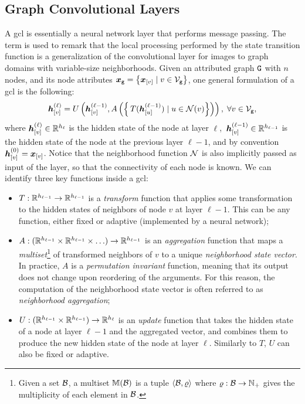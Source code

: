\subsection{Graph Convolutional Layers}\label{sec:graph-conv-layers}
A \gls{gcl} is essentially a neural network layer that performs message passing. The term  is used to remark that the local processing performed by the state transition function is a generalization of the convolutional layer for images to graph domains with variable-size neighborhoods. Given an attributed graph $\GraphU{g}$ with $n$ nodes, and its node attributes $\GraphFeatures{x}{g} = \Set{\Elem{x}{v} \mid v \in \Nodes{g}}$, one general formulation of a \gls{gcl} is the following:
\begin{align}
    \label{eq:simple-aggregation}
    \StateVector{v}{\ell} = U \Par{\StateVector{v}{\ell-1}, A\Par{\Set{\,T(\StateVector{u}{\ell-1}) \mid u \in \Neigh(v)}}}, \; \forall v \in \Nodes{g},
\end{align}
where $\StateVector{v}{\ell} \in \Real^{h_\ell}$ is the hidden state of the node at layer $\ell$, $\,\StateVector{v}{\ell-1} \in \Real^{h_{\ell-1}}$ is the hidden state of the node at the previous layer $\ell-1$, and by convention $\StateVector{v}{0} = \Elem{x}{v}$. Notice that the neighborhood function $\Neigh$ is also implicitly passed as input of the layer, so that the connectivity of each node is known. We can identify three key functions inside a \gls{gcl}:
\begin{itemize}
    \item $T: \mathbb{R}^{h_{\ell-1}} \rightarrow \mathbb{R}^{h_{\ell-1}}$ is a \emph{transform} function that applies some transformation to the hidden states of neighbors of node $v$ at layer $\ell-1$. This can be any function, either fixed or adaptive (implemented by a neural network);
    \item $A: (\mathbb{R}^{h_{\ell-1}} \times \mathbb{R}^{h_{\ell-1}} \times \ldots) \rightarrow \mathbb{R}^{h_{\ell-1}}$ is an \emph{aggregation} function that maps a \emph{multiset}\footnote{Given a set $\Cal{B}$, a multiset $\Multiset(\Cal{B})$ is a tuple $\Tuple{\Cal{B}, \varrho}$ where $\varrho: \Cal{B} \shortrightarrow \Natural_+$ gives the multiplicity of each element in $\Cal{B}$.} of transformed neighbors of $v$ to a unique \emph{neighborhood state vector}. In practice, $A$ is a \emph{permutation invariant} function, meaning that its output does not change upon reordering of the arguments. For this reason, the computation of the neighborhood state vector is often referred to as \emph{neighborhood aggregation};
    \item $U: (\mathbb{R}^{h_{\ell-1}} \times \mathbb{R}^{h_{\ell-1}}) \rightarrow \mathbb{R}^{h_{\ell}}$ is an \emph{update} function that takes the hidden state of a node at layer $\ell-1$ and the aggregated vector, and combines them to produce the new hidden state of the node at layer $\ell$. Similarly to $T$, $U$ can also be fixed or adaptive.
\end{itemize}

